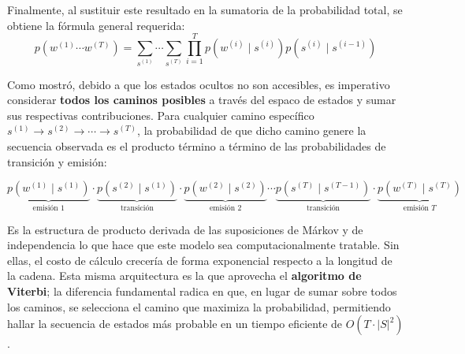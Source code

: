 \medskip

Finalmente, al sustituir este resultado en la sumatoria de la probabilidad total, se obtiene la fórmula general
requerida:
\[
p\!\left(w^{(1)} \cdots w^{(T)}\right) = \sum_{s^{(1)}} \cdots \sum_{s^{(T)}} \prod_{i=1}^{T} p\!\left(w^{(i)} \mid s^{(i)}\right) p\!\left(s^{(i)} \mid s^{(i-1)}\right)
\]

\vspace{1em}

Como mostró, debido a que los estados ocultos no son accesibles, es imperativo considerar
\textbf{todos los caminos posibles} a través del espaco de estados y sumar sus respectivas contribuciones.
Para cualquier camino específico $s^{(1)} \to s^{(2)} \to \cdots \to s^{(T)}$, la probabilidad de que dicho camino
genere la secuencia observada es el producto término a término de las probabilidades de transición y emisión:

\[
\underbrace{p(w^{(1)}\mid s^{(1)})}_{\text{emisión } 1} \cdot \underbrace{p(s^{(2)}\mid s^{(1)})}_{\text{transición}} \cdot \underbrace{p(w^{(2)}\mid s^{(2)})}_{\text{emisión } 2} \cdots \underbrace{p(s^{(T)}\mid s^{(T-1)})}_{\text{transición}} \cdot \underbrace{p(w^{(T)}\mid s^{(T)})}_{\text{emisión } T}
\]

\medskip

Es la estructura de producto derivada de las suposiciones de Márkov y de independencia lo que hace que este
modelo sea computacionalmente tratable. Sin ellas, el costo de cálculo crecería de forma exponencial respecto a
la longitud de la cadena. Esta misma arquitectura es la que aprovecha el \textbf{algoritmo de Viterbi}; la
diferencia fundamental radica en que, en lugar de sumar sobre todos los caminos, se selecciona el camino que
maximiza la probabilidad, permitiendo hallar la secuencia de estados más probable en un tiempo eficiente de
$O(T \cdot |S|^2)$.

